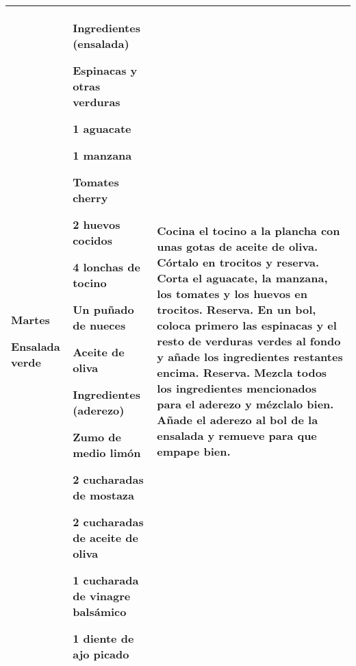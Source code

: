 \documentclass[menu.tex]{subfiles}
\begin{document}
\begin{tabular} {p{3cm} p{4.5cm} p{9cm}}
\pbox{20cm}
{
    \rule{0pt}{3ex}\begin{large}\textbf{Martes}\end{large}\\ 
    \rule{0pt}{2ex}Ensalada verde
} & 
\vspace{-0.6cm}
\hspace{0.5cm}\begin{footnotesize}Ingredientes (ensalada)\end{footnotesize}
\begin{compactitem} 
    \begin{scriptsize}
        \item Espinacas y otras verduras
        \item 1 aguacate
        \item 1 manzana
        \item Tomates cherry
        \item 2 huevos cocidos
        \item 4 lonchas de tocino
        \item Un puñado de nueces
        \item Aceite de oliva
    \end{scriptsize}
\end{compactitem}
\hspace{0.3cm}
\begin{footnotesize}Ingredientes (aderezo)\end{footnotesize}
\begin{compactitem} 
    \begin{scriptsize}
        \item Zumo de medio limón
        \item 2 cucharadas de mostaza
        \item 2 cucharadas de aceite de oliva
        \item 1 cucharada de vinagre balsámico
        \item 1 diente de ajo picado
    \end{scriptsize}
\end{compactitem} &
\vspace{-0.6cm}
Cocina el tocino a la plancha con unas gotas de aceite de oliva. Córtalo en trocitos y reserva.
Corta el aguacate, la manzana, los tomates y los huevos en trocitos. Reserva.
En un bol, coloca primero las espinacas y el resto de verduras verdes al fondo y añade los ingredientes restantes encima. Reserva.
Mezcla todos los ingredientes mencionados para el aderezo y mézclalo bien.
Añade el aderezo al bol de la ensalada y remueve para que empape bien.\\
\hline


\end{tabular}
\end{document}
